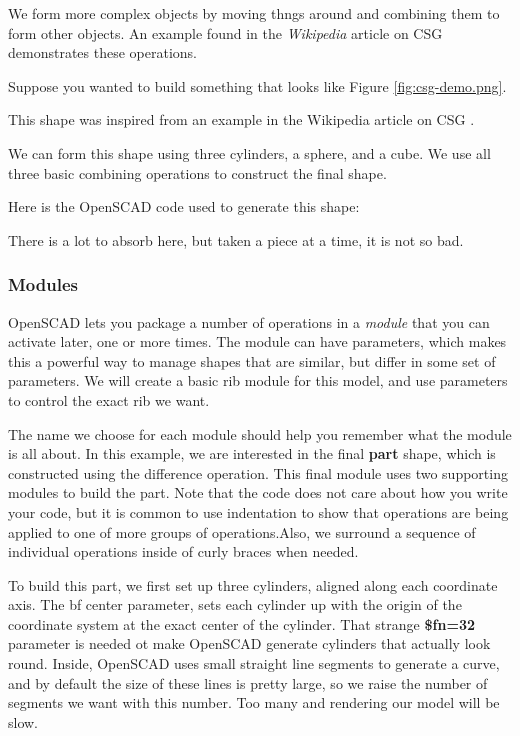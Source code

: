 We form more complex objects by moving thngs around and combining them to form other objects. An example found in the {\it Wikipedia} article on CSG demonstrates these operations.

Suppose you wanted to build something that looks like Figure \ref{fig:csg-demo.png}.


This shape was inspired from an example in the Wikipedia article on CSG
\cite{csgwiki}.

We can form this shape using three cylinders, a sphere, and a cube. We use all
three basic combining operations to construct the final shape.

Here is the OpenSCAD code used to generate this shape:


There is a lot to absorb here, but taken a piece at a time, it is not so bad.

\subsubsection*{Modules}

OpenSCAD lets you package a number of operations in a {\it module} that you can
activate later, one or more times. The module can have parameters, which makes
this a powerful way to manage shapes that are similar, but differ in some set
of parameters. We will create a basic rib module for this model, and use
parameters to control the exact rib we want.

The name we choose for each module should help you remember what the module is
all about. In this example, we are interested in the final {\bf part} shape,
which is constructed using the difference operation. This final module uses two
supporting modules to build the part. Note that the code does not care about
how you write your code, but it is common to use indentation to show that
operations are being applied to one of more groups of operations.Also, we
surround a sequence of individual operations inside of curly braces when
needed.

To build this part, we first set up three cylinders, aligned along each
coordinate axis. The {bf center} parameter, sets each cylinder up with the
origin of the coordinate system at the exact center of the cylinder. That
strange {\bf \$fn=32} parameter is needed ot make OpenSCAD generate cylinders
that actually look round. Inside, OpenSCAD uses small straight line segments to
generate a curve, and by default the size of these lines is pretty large, so we
raise the number of segments we want with this number. Too many and rendering
our model will be slow.

